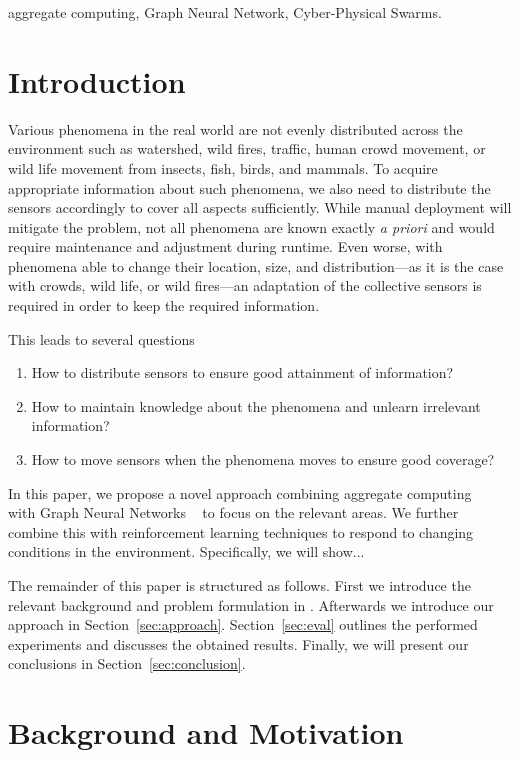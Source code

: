 \documentclass[conference]{IEEEtran}
\begin{document}
\begin{IEEEkeywords}
aggregate computing, Graph Neural Network, Cyber-Physical Swarms.
\end{IEEEkeywords}
%
\section{Introduction}
Various phenomena in the real world are not evenly distributed across the environment such as watershed, wild fires, traffic, human crowd movement, or wild life movement from insects, fish, birds, and mammals.
To acquire appropriate information about such phenomena, we also need to distribute the sensors accordingly to cover all aspects sufficiently. While manual deployment will mitigate the problem, not all phenomena are known exactly \emph{a priori} and would require maintenance and adjustment during runtime. Even worse, with phenomena able to change their location, size, and distribution---as it is the case with crowds, wild life, or wild fires---an adaptation of the collective sensors is required in order to keep the required information. 

This leads to several questions 
\begin{enumerate}
	\item How to distribute sensors to ensure good attainment of information?
	\item How to maintain knowledge about the phenomena and unlearn irrelevant information?
	\item How to move sensors when the phenomena moves to ensure good coverage?
\end{enumerate} 

In this paper, we propose a novel approach combining aggregate computing
~\cite{Beal2015Computer} with Graph Neural Networks
~\cite{Zhou2020AIOpen} to focus on the relevant areas. We further combine this with reinforcement learning techniques to respond to changing conditions in the environment.
Specifically, we will show... 

The remainder of this paper is structured as follows. First we introduce the relevant background and problem formulation in . Afterwards we introduce our approach in Section~\ref{sec:approach}. Section~\ref{sec:eval} outlines the performed experiments and discusses the obtained results. Finally, we will present our conclusions in Section~\ref{sec:conclusion}.


\section{Background and Motivation}
\label{sec:background}
\end{document}
